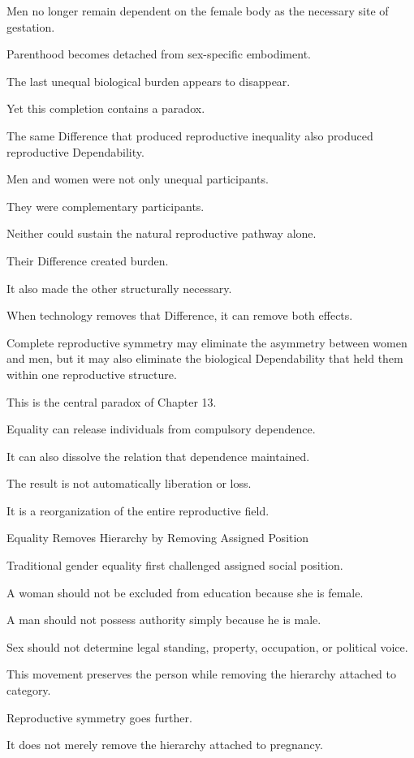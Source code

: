 Men no longer remain dependent on the female body as the necessary site of gestation.

Parenthood becomes detached from sex-specific embodiment.

The last unequal biological burden appears to disappear.

Yet this completion contains a paradox.

The same Difference that produced reproductive inequality also produced reproductive Dependability.

Men and women were not only unequal participants.

They were complementary participants.

Neither could sustain the natural reproductive pathway alone.

Their Difference created burden.

It also made the other structurally necessary.

When technology removes that Difference, it can remove both effects.

Complete reproductive symmetry may eliminate the asymmetry between women and men, but it may also eliminate the biological Dependability that held them within one reproductive structure.

This is the central paradox of Chapter 13.

Equality can release individuals from compulsory dependence.

It can also dissolve the relation that dependence maintained.

The result is not automatically liberation or loss.

It is a reorganization of the entire reproductive field.

Equality Removes Hierarchy by Removing Assigned Position

Traditional gender equality first challenged assigned social position.

A woman should not be excluded from education because she is female.

A man should not possess authority simply because he is male.

Sex should not determine legal standing, property, occupation, or political voice.

This movement preserves the person while removing the hierarchy attached to category.

Reproductive symmetry goes further.

It does not merely remove the hierarchy attached to pregnancy.

